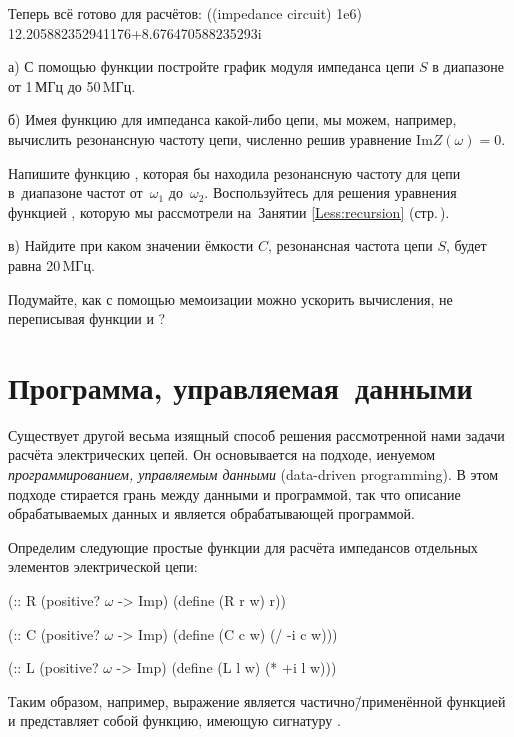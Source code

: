 Теперь всё готово для расчётов:
\REPL
  {((impedance circuit) 1e6)}
  {12.205882352941176+8.676470588235293i}

\begin{Assignment}
а) С помощью функции  постройте график модуля импеданса цепи $S$ в диапазоне от 1\,МГц до 50\,MГц.

б) Имея функцию для импеданса какой-либо цепи, мы можем, например, вычислить резонансную частоту цепи, численно решив уравнение $\mathrm{Im} Z(\omega) = 0$.

Напишите функцию , которая бы находила резонансную частоту для цепи  в~диапазоне частот от~$\omega_1$ до~$\omega_2$. Воспользуйтесь для решения уравнения функцией , которую мы рассмотрели на~Занятии \ref{Less:recursion}  (стр.\,\pageref{bisection}).

в) Найдите при каком значении ёмкости $C$, резонансная частота цепи $S$, будет равна 20\,MГц. 

Подумайте, как с помощью мемоизации можно ускорить вычисления, не переписывая функции  и ?
\end{Assignment}

\section{Программа, \mbox{управляемая данными}}%
Существует другой весьма изящный способ решения рассмотренной нами задачи расчёта электрических цепей. Он основывается на подходе, иенуемом \emph{программированием, управляемым данными} (data-driven programming). В этом подходе стирается грань между данными и программой, так что описание обрабатываемых данных и является обрабатывающей программой.

Определим следующие простые функции для расчёта импедансов отдельных элементов электрической цепи:
\begin{Definition}
(:: R (positive? $\omega$ -> Imp)
  (define (R r w) r))

(:: C (positive? $\omega$ -> Imp)
  (define (C c w) (/ -i c w)))

(:: L (positive? $\omega$ -> Imp)
  (define (L l w) (* +i l w)))
\end{Definition}\newpage
Таким образом, например, выражение  является частично\=/применённой функцией  и представляет собой функцию, имеющую сигнатуру .

